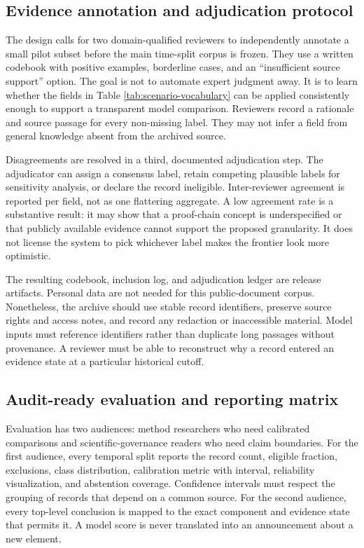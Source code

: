\documentclass[conference]{IEEEtran}
\begin{document}
\subsection{Evidence annotation and adjudication protocol}

The design calls for two domain-qualified reviewers to independently annotate a small pilot subset before the main time-split corpus is frozen. They use a written codebook with positive examples, borderline cases, and an ``insufficient source support'' option. The goal is not to automate expert judgment away. It is to learn whether the fields in Table \ref{tab:scenario-vocabulary} can be applied consistently enough to support a transparent model comparison. Reviewers record a rationale and source passage for every non-missing label. They may not infer a field from general knowledge absent from the archived source.

Disagreements are resolved in a third, documented adjudication step. The adjudicator can assign a consensus label, retain competing plausible labels for sensitivity analysis, or declare the record ineligible. Inter-reviewer agreement is reported per field, not as one flattering aggregate. A low agreement rate is a substantive result: it may show that a proof-chain concept is underspecified or that publicly available evidence cannot support the proposed granularity. It does not license the system to pick whichever label makes the frontier look more optimistic.

The resulting codebook, inclusion log, and adjudication ledger are release artifacts. Personal data are not needed for this public-document corpus. Nonetheless, the archive should use stable record identifiers, preserve source rights and access notes, and record any redaction or inaccessible material. Model inputs must reference identifiers rather than duplicate long passages without provenance. A reviewer must be able to reconstruct why a record entered an evidence state at a particular historical cutoff.

\subsection{Audit-ready evaluation and reporting matrix}

Evaluation has two audiences: method researchers who need calibrated comparisons and scientific-governance readers who need claim boundaries. For the first audience, every temporal split reports the record count, eligible fraction, exclusions, class distribution, calibration metric with interval, reliability visualization, and abstention coverage. Confidence intervals must respect the grouping of records that depend on a common source. For the second audience, every top-level conclusion is mapped to the exact component and evidence state that permits it. A model score is never translated into an announcement about a new element.
\end{document}
